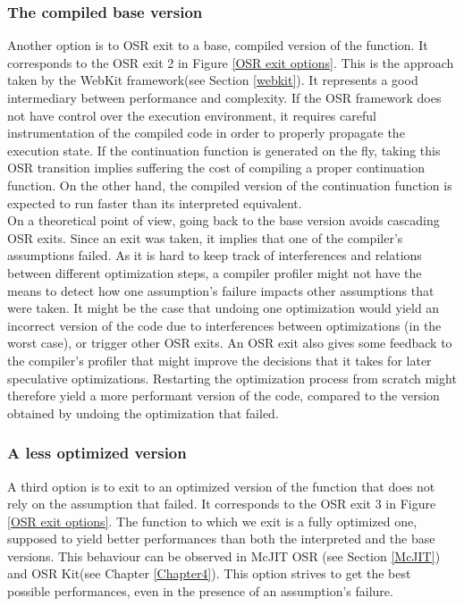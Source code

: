 \subsubsection{The compiled base version}
Another option is to OSR exit to a base, compiled version of the function.
It corresponds to the OSR exit 2 in Figure \ref{OSR exit options}.
This is the approach taken by the WebKit framework\cite{WebKitURL}(see Section \ref{webkit}).
It represents a good intermediary between performance and complexity.
If the OSR framework does not have control over the execution environment, it requires careful instrumentation of the compiled code in order to properly propagate the execution state.
If the continuation function is generated on the fly, taking this OSR transition implies suffering the cost of compiling a proper continuation function.
On the other hand, the compiled version of the continuation function is expected to run faster than its interpreted equivalent.\\

On a theoretical point of view, going back to the base version avoids cascading OSR exits.
Since an exit was taken, it implies that one of the compiler's assumptions failed.
As it is hard to keep track of interferences and relations between different optimization steps, a compiler profiler might not have the means to detect how one assumption's failure impacts other assumptions that were taken.
It might be the case that undoing one optimization would yield an incorrect version of the code due to interferences between optimizations (in the worst case), or trigger other OSR exits.
An OSR exit also gives some feedback to the compiler's profiler that might improve the decisions that it takes for later speculative optimizations.
Restarting the optimization process from scratch might therefore yield a more performant version of the code, compared to the version obtained by undoing the optimization that failed.\\

\subsubsection{A less optimized version}
A third option is to exit to an optimized version of the function that does not rely on the assumption that failed.
It corresponds to the OSR exit 3 in Figure \ref{OSR exit options}.
The function to which we exit is a fully optimized one, supposed to yield better performances than both the interpreted and the base versions.
This behaviour can be observed in McJIT OSR\cite{lameed2013modular} (see Section \ref{McJIT}) and OSR Kit\cite{OSRKit}(see Chapter \ref{Chapter4}).
This option strives to get the best possible performances, even in the presence of an assumption's failure.\\

